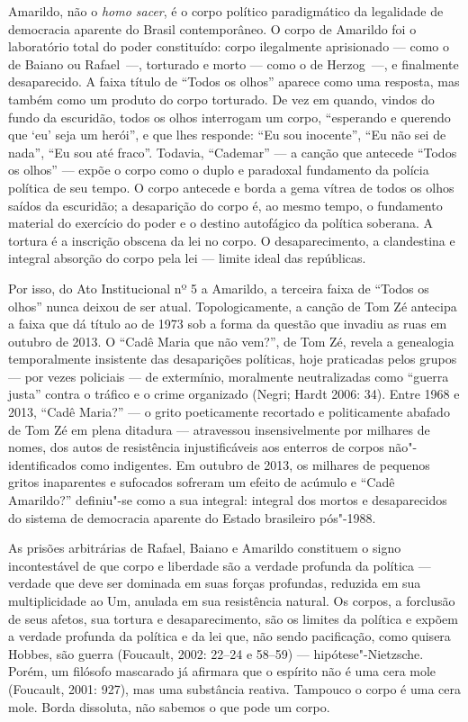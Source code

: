Amarildo, não o \emph{homo sacer}, é o corpo político paradigmático da
legalidade de democracia aparente do Brasil contemporâneo. O corpo de
Amarildo foi o laboratório total do poder constituído: corpo ilegalmente
aprisionado --- como o de Baiano ou Rafael~---, torturado e morto --- como
o de Herzog~---, e finalmente desaparecido. A faixa título de ``Todos os
olhos'' aparece como uma resposta, mas também como um produto do corpo
torturado. De vez em quando, vindos do fundo da escuridão, todos os
olhos interrogam um corpo, ``esperando e querendo que `eu' seja um
herói'', e que lhes responde: ``Eu sou inocente'', ``Eu não sei de
nada'', ``Eu sou até fraco''. Todavia, ``Cademar'' --- a canção que
antecede ``Todos os olhos'' --- expõe o corpo como o duplo e paradoxal
fundamento da polícia política de seu tempo. O corpo antecede e borda a
gema vítrea de todos os olhos saídos da escuridão; a desaparição do
corpo é, ao mesmo tempo, o fundamento material do exercício do poder e o
destino autofágico da política soberana. A tortura é a inscrição obscena
da lei no corpo. O desaparecimento, a clandestina e integral absorção do
corpo pela lei --- limite ideal das repúblicas.

Por isso, do Ato Institucional nº 5 a Amarildo, a terceira faixa de
``Todos os olhos'' nunca deixou de ser atual. Topologicamente, a canção
de Tom Zé antecipa a faixa que dá título ao  de 1973 sob a forma da
questão que invadiu as ruas em outubro de 2013. O ``Cadê Maria que não
vem?'', de Tom Zé, revela a genealogia temporalmente insistente das
desaparições políticas, hoje praticadas pelos grupos --- por vezes
policiais --- de extermínio, moralmente neutralizadas como ``guerra
justa'' contra o tráfico e o crime organizado (Negri; Hardt 2006: 34).
Entre 1968 e 2013, ``Cadê Maria?'' --- o grito poeticamente recortado e
politicamente abafado de Tom Zé em plena ditadura --- atravessou
insensivelmente por milhares de nomes, dos autos de resistência
injustificáveis aos enterros de corpos não"-identificados como
indigentes. Em outubro de 2013, os milhares de pequenos gritos
inaparentes e sufocados sofreram um efeito de acúmulo e ``Cadê
Amarildo?'' definiu"-se como a sua integral: integral dos mortos e
desaparecidos do sistema de democracia aparente do Estado brasileiro
pós"-1988.

As prisões arbitrárias de Rafael, Baiano e Amarildo constituem o signo
incontestável de que corpo e liberdade são a verdade profunda da
política --- verdade que deve ser dominada em suas forças profundas,
reduzida em sua multiplicidade ao Um, anulada em sua resistência
natural. Os corpos, a forclusão de seus afetos, sua tortura e
desaparecimento, são os limites da política e expõem a verdade profunda
da política e da lei que, não sendo pacificação, como quisera Hobbes,
são guerra (Foucault, 2002: 22--24 e 58--59) --- hipótese"-Nietzsche.
Porém, um filósofo mascarado já afirmara que o espírito não é uma cera
mole (Foucault, 2001: 927), mas uma substância reativa. Tampouco o
corpo é uma cera mole. Borda dissoluta, não sabemos o que pode um corpo.

